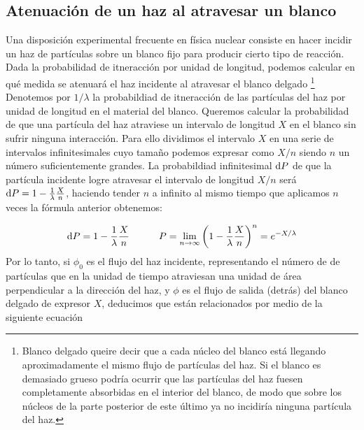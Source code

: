 \subsection{Atenuación de un haz al atravesar un blanco}

Una disposición experimental frecuente en física nuclear consiste en hacer incidir un haz de partículas sobre un blanco fijo para producir cierto tipo de reacción. Dada la probabilidad de itneracción por unidad de longitud, podemos calcular en qué medida se atenuará el haz incidente al atravesar el blanco delgado \footnote{Blanco delgado queire decir que a cada núcleo del blanco está llegando aproximadamente el mismo flujo de partículas del haz. Si el blanco es demasiado grueso podría ocurrir que las partículas del haz fuesen completamente absorbidas en el interior del blanco, de modo que sobre los núcleos de la parte posterior de este último ya no incidiría ninguna partícula del haz.} Denotemos por $1/\lambda$ la probabildiad de itneracción de las partículas del haz por unidad de longitud en el material del blanco. Queremos calcular la probabilidad de que una partícula del haz atraviese un intervalo de longitud $X$ en el blanco sin sufrir ninguna interacción. Para ello dividimos el intervalo $X$ en una serie de intervalos infinitesimales cuyo tamaño podemos expresar como $X/n$ siendo $n$ un número suficientemente grandes. La probabildiad infinitesimal $\mathrm{d} P$ de que la partícula incidente logre atravesar el intervalo de longitud $X/n$ será $\mathrm{d} P = 1 - \frac{1}{\lambda} \frac{X}{n}$, haciendo tender $n$ a infinito al mismo tiempo que aplicamos $n$ veces la fórmula anterior obtenemos:  

\begin{equation}
    \mathrm{d} P = 1 - \frac{1}{\lambda} \frac{X}{n} \quad \quad \quad P = \lim_{n\rightarrow \infty} \left( 1 - \frac{1}{\lambda}\frac{X}{n} \right)^n = e^{-X/\lambda}
\end{equation}
Por lo tanto, si $\phi_0$ es el flujo del haz incidente, representando el número de de partículas que en la unidad de tiempo atraviesan una unidad de área perpendicular a la dirección del haz, y $\phi$ es el flujo de salida (detrás) del blanco delgado de expresor $X$, deducimos que están relacionados por medio de la siguiente ecuación 

